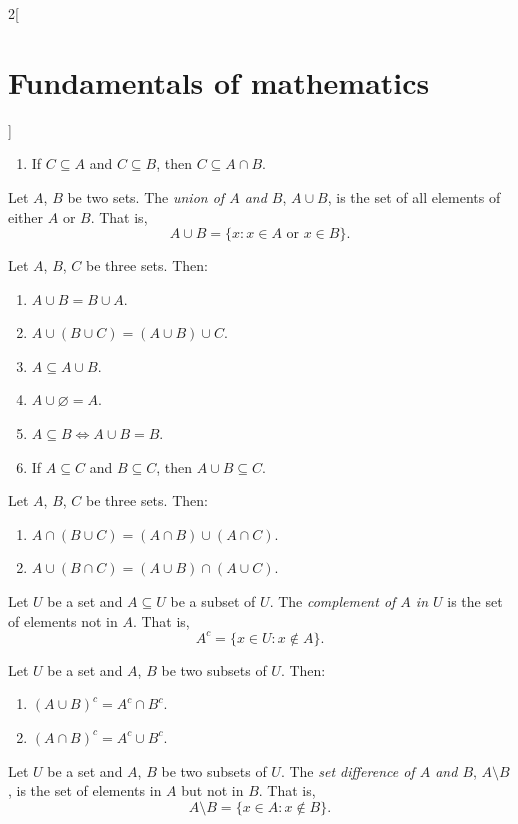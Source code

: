 \documentclass[../../../main.tex]{subfiles}
\begin{document}
\begin{multicols}{2}[\section{Fundamentals of mathematics}]
\begin{prop}
\begin{enumerate}
      \item If $C\subseteq A$ and $C\subseteq B$, then $C\subseteq A\cap B$.
    \end{enumerate}
  \end{prop}
  \begin{definition}
    Let $A$, $B$ be two sets. The \textit{union of $A$ and $B$}, $A\cup B$, is the set of all elements of either $A$ or $B$. That is, $$A\cup B=\{x:x\in A\text{ or }x\in B\}.$$
  \end{definition}
  \begin{prop}
    Let $A$, $B$, $C$ be three sets. Then:
    \begin{enumerate}
      \item $A\cup B=B\cup A$.
      \item $A\cup(B\cup C)=(A\cup B)\cup C$.
      \item $A\subseteq A\cup B$.
      \item $A\cup\varnothing=A$.
      \item $A\subseteq B\iff A\cup B=B$.
      \item If $A\subseteq C$ and $B\subseteq C$, then $A\cup B\subseteq C$.
    \end{enumerate}
  \end{prop}
  \begin{prop}
    Let $A$, $B$, $C$ be three sets. Then:
    \begin{enumerate}
      \item $A\cap (B\cup C)=(A\cap B)\cup (A\cap C)$.
      \item $A\cup (B\cap C)=(A\cup B)\cap (A\cup C)$.
    \end{enumerate}
  \end{prop}
  \begin{definition}
    Let $U$ be a set and $A\subseteq U$ be a subset of $U$. The \textit{complement of $A$ in $U$} is the set of elements not in $A$. That is, $$A^c=\{x\in U:x\notin A\}.$$
  \end{definition}
  \begin{prop}
    Let $U$ be a set and $A$, $B$ be two subsets of $U$. Then:
    \begin{enumerate}
      \item $(A\cup B)^c=A^c\cap B^c$.
      \item $(A\cap B)^c=A^c\cup B^c$.
    \end{enumerate}
  \end{prop}
  \begin{definition}
    Let $U$ be a set and $A$, $B$ be two subsets of $U$. The \textit{set difference of $A$ and $B$}, $A\setminus B$, is the set of elements in $A$ but not in $B$. That is, $$A\setminus B=\{x\in A:x\notin B\}.$$

\end{definition}
\end{multicols}
\end{document}

